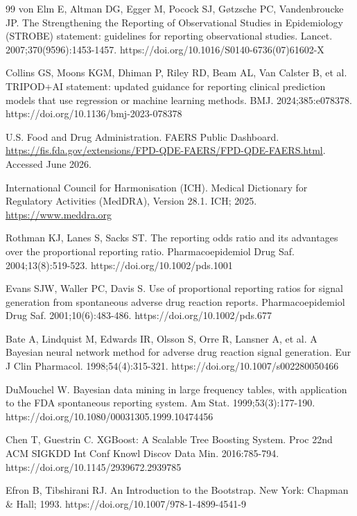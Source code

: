 \documentclass[10pt,a4paper]{article}
\begin{document}
\begin{thebibliography}{99}
von Elm E, Altman DG, Egger M, Pocock SJ, G{\o}tzsche PC, Vandenbroucke JP.
The Strengthening the Reporting of Observational Studies in Epidemiology (STROBE) statement: guidelines for reporting observational studies.
Lancet. 2007;370(9596):1453-1457.
https://doi.org/10.1016/S0140-6736(07)61602-X

Collins GS, Moons KGM, Dhiman P, Riley RD, Beam AL, Van Calster B, et al.
TRIPOD+AI statement: updated guidance for reporting clinical prediction models that use regression or machine learning methods.
BMJ. 2024;385:e078378.
https://doi.org/10.1136/bmj-2023-078378

U.S. Food and Drug Administration.
FAERS Public Dashboard.
\url{https://fis.fda.gov/extensions/FPD-QDE-FAERS/FPD-QDE-FAERS.html}.
Accessed June 2026.

International Council for Harmonisation (ICH).
Medical Dictionary for Regulatory Activities (MedDRA), Version 28.1. ICH; 2025.
\url{https://www.meddra.org}

Rothman KJ, Lanes S, Sacks ST.
The reporting odds ratio and its advantages over the proportional reporting ratio.
Pharmacoepidemiol Drug Saf. 2004;13(8):519-523.
https://doi.org/10.1002/pds.1001

Evans SJW, Waller PC, Davis S.
Use of proportional reporting ratios for signal generation from spontaneous adverse drug reaction reports.
Pharmacoepidemiol Drug Saf. 2001;10(6):483-486.
https://doi.org/10.1002/pds.677

Bate A, Lindquist M, Edwards IR, Olsson S, Orre R, Lansner A, et al.
A Bayesian neural network method for adverse drug reaction signal generation.
Eur J Clin Pharmacol. 1998;54(4):315-321.
https://doi.org/10.1007/s002280050466

DuMouchel W.
Bayesian data mining in large frequency tables, with application to the FDA spontaneous reporting system.
Am Stat. 1999;53(3):177-190.
https://doi.org/10.1080/00031305.1999.10474456

Chen T, Guestrin C.
XGBoost: A Scalable Tree Boosting System.
Proc 22nd ACM SIGKDD Int Conf Knowl Discov Data Min. 2016:785-794.
https://doi.org/10.1145/2939672.2939785

Efron B, Tibshirani RJ.
An Introduction to the Bootstrap. New York: Chapman \& Hall; 1993.
https://doi.org/10.1007/978-1-4899-4541-9


\end{thebibliography}
\end{document}
